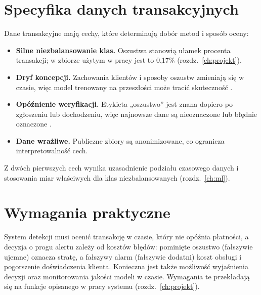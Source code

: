 \section{Specyfika danych transakcyjnych}
Dane transakcyjne mają cechy, które determinują dobór metod i sposób oceny:
\begin{itemize}
  \item \textbf{Silne niezbalansowanie klas.} Oszustwa stanowią ułamek procenta transakcji; w zbiorze użytym w pracy jest to 0{,}17\% (rozdz.~\ref{ch:projekt}).
  \item \textbf{Dryf koncepcji.} Zachowania klientów i sposoby oszustw zmieniają się w czasie, więc model trenowany na przeszłości może tracić skuteczność \cite{dalpozzolo2018}.
  \item \textbf{Opóźnienie weryfikacji.} Etykieta „oszustwo” jest znana dopiero po zgłoszeniu lub dochodzeniu, więc najnowsze dane są nieoznaczone lub błędnie oznaczone \cite{dalpozzolo2018}.
  \item \textbf{Dane wrażliwe.} Publiczne zbiory są anonimizowane, co ogranicza interpretowalność cech.
\end{itemize}
Z dwóch pierwszych cech wynika uzasadnienie podziału czasowego danych i stosowania miar właściwych dla klas niezbalansowanych (rozdz.~\ref{ch:ml}).

\section{Wymagania praktyczne}
System detekcji musi ocenić transakcję w czasie, który nie opóźnia płatności, a decyzja o progu alertu zależy od kosztów błędów: pominięte oszustwo (fałszywie ujemne) oznacza stratę, a fałszywy alarm (fałszywie dodatni) koszt obsługi i pogorszenie doświadczenia klienta. Konieczna jest także możliwość wyjaśnienia decyzji oraz monitorowania jakości modeli w czasie. Wymagania te przekładają się na funkcje opisanego w pracy systemu (rozdz.~\ref{ch:projekt}).
